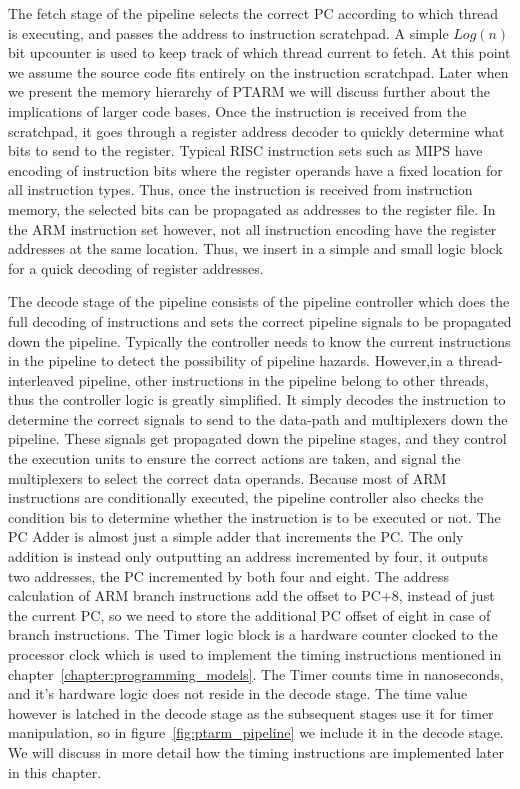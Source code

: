 The fetch stage of the pipeline selects the correct PC according to which thread is executing, and passes the address to instruction scratchpad.
A simple $Log(n)$ bit upcounter is used to keep track of which thread current to fetch.  
At this point we assume the source code fits entirely on the instruction scratchpad.
Later when we present the memory hierarchy of PTARM we will discuss further about the implications of larger code bases.
Once the instruction is received from the scratchpad, it goes through a register address decoder to quickly determine what bits to send to the register.
Typical RISC instruction sets such as MIPS have encoding of instruction bits where the register operands have a fixed location for all instruction types.
Thus, once the instruction is received from instruction memory, the selected bits can be propagated as addresses to the register file. 
In the ARM instruction set however, not all instruction encoding have the register addresses at the same location. 
Thus, we insert in a simple and small logic block for a quick decoding of register addresses.

The decode stage of the pipeline consists of the pipeline controller which does the full decoding of instructions and sets the correct pipeline signals to be propagated down the pipeline. 
Typically the controller needs to know the current instructions in the pipeline to detect the possibility of pipeline hazards.
However,in a thread-interleaved pipeline, other instructions in the pipeline belong to other threads, thus the controller logic is greatly simplified. 
It simply decodes the instruction to determine the correct signals to send to the data-path and multiplexers down the pipeline. 
These signals get propagated down the pipeline stages, and they control the execution units to ensure the correct actions are taken, and signal the multiplexers to select the correct data operands.  
Because most of ARM instructions are conditionally executed, the pipeline controller also checks the condition bis to determine whether the instruction is to be executed or not.  
The PC Adder is almost just a simple adder that increments the PC. 
The only addition is instead only outputting an address incremented by four, it outputs two addresses, the PC incremented by both four and eight. 
The address calculation of ARM branch instructions add the offset to PC+8, instead of just the current PC, so we need to store the additional PC offset of eight in case of branch instructions.
The Timer logic block is a hardware counter clocked to the processor clock which is used to implement the timing instructions mentioned in chapter~\ref{chapter:programming_models}.
The Timer counts time in nanoseconds, and it's hardware logic does not reside in the decode stage. 
The time value however is latched in the decode stage as the subsequent stages use it for timer manipulation, so in figure~\ref{fig:ptarm_pipeline} we include it in the decode stage.
We will discuss in more detail how the timing instructions are implemented later in this chapter. 

